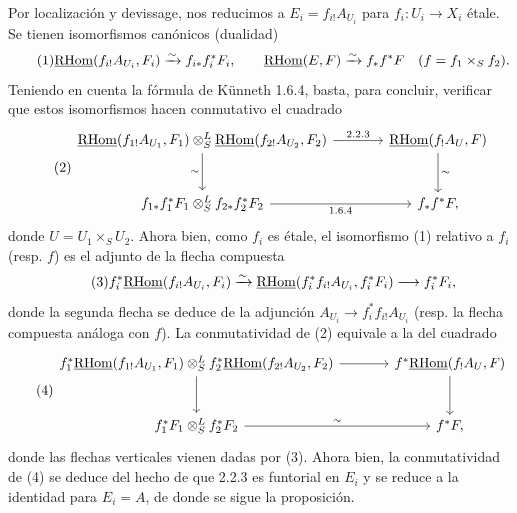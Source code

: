 Por localización y devissage, nos reducimos a $E_i=f_{i!}A_{U_i}$ para $f_i:U_i\to X_i$ étale. Se tienen isomorfismos canónicos (dualidad)
\begin{equation}\tag{1}
\underline{\mathrm{RHom}}(f_{i!}A_{U_i},F_i)\xrightarrow{\sim}f_{i*}f_i^{*}F_i,
\qquad
\underline{\mathrm{RHom}}(E,F)\xrightarrow{\sim}f_{*}f^{*}F\quad(f=f_1\times_S f_2).
\end{equation}
Teniendo en cuenta la fórmula de Künneth 1.6.4, basta, para concluir, verificar que estos isomorfismos hacen conmutativo el cuadrado
\begin{equation}\tag{2}
\begin{tikzcd}[column sep=large,row sep=large]
\uRHom(f_{1!}A_{U_1},F_1)\otimes^{L}_{S}\uRHom(f_{2!}A_{U_2},F_2) \arrow[r,"2.2.3"] \arrow[d,"\sim"'] & \uRHom(f_{!}A_U,F) \arrow[d,"\sim"]\\
f_{1*}f_1^{*}F_1\otimes^{L}_{S}f_{2*}f_2^{*}F_2 \arrow[r,"1.6.4"'] & f_{*}f^{*}F,
\end{tikzcd}
\end{equation}
donde $U=U_1\times_S U_2$. Ahora bien, como $f_i$ es étale, el isomorfismo (1) relativo a $f_i$ (resp. $f$) es el adjunto de la flecha compuesta
\begin{equation}\tag{3}
f_i^{*}\underline{\mathrm{RHom}}(f_{i!}A_{U_i},F_i)\xrightarrow{\sim}\underline{\mathrm{RHom}}(f_i^{*}f_{i!}A_{U_i},f_i^{*}F_i)\longrightarrow f_i^{*}F_i,
\end{equation}
donde la segunda flecha se deduce de la adjunción $A_{U_i}\to f_i^{*}f_{i!}A_{U_i}$ (resp. la flecha compuesta análoga con $f$). La conmutatividad de (2) equivale a la del cuadrado
\begin{equation}\tag{4}
\begin{tikzcd}[column sep=large,row sep=large]
f_1^{*}\uRHom(f_{1!}A_{U_1},F_1)\otimes^{L}_{S}f_2^{*}\uRHom(f_{2!}A_{U_2},F_2) \arrow[r] \arrow[d] & f^{*}\uRHom(f_{!}A_U,F) \arrow[d]\\
f_1^{*}F_1\otimes^{L}_{S}f_2^{*}F_2 \arrow[r,"\sim"] & f^{*}F,
\end{tikzcd}
\end{equation}
donde las flechas verticales vienen dadas por (3). Ahora bien, la conmutatividad de (4) se deduce del hecho de que 2.2.3 es funtorial en $E_i$ y se reduce a la identidad para $E_i=A$, de donde se sigue la proposición.

